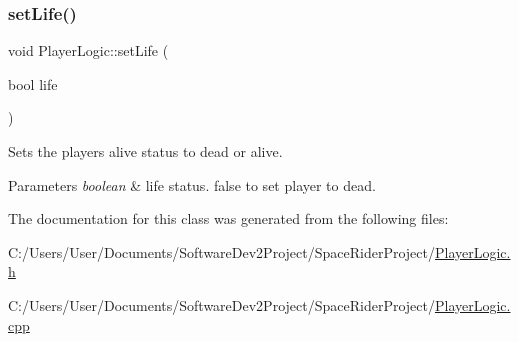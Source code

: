 \subsubsection{\texorpdfstring{set\+Life()}{setLife()}}
{\footnotesize\ttfamily void Player\+Logic\+::set\+Life (\begin{DoxyParamCaption}\item[{bool}]{life }\end{DoxyParamCaption})}



Sets the players alive status to dead or alive. 


\begin{DoxyParams}{Parameters}
{\em boolean} & life status. false to set player to dead. \\
\hline
\end{DoxyParams}


The documentation for this class was generated from the following files\+:\begin{DoxyCompactItemize}
\item 
C\+:/\+Users/\+User/\+Documents/\+Software\+Dev2\+Project/\+Space\+Rider\+Project/\hyperlink{_player_logic_8h}{Player\+Logic.\+h}\item 
C\+:/\+Users/\+User/\+Documents/\+Software\+Dev2\+Project/\+Space\+Rider\+Project/\hyperlink{_player_logic_8cpp}{Player\+Logic.\+cpp}\end{DoxyCompactItemize}
